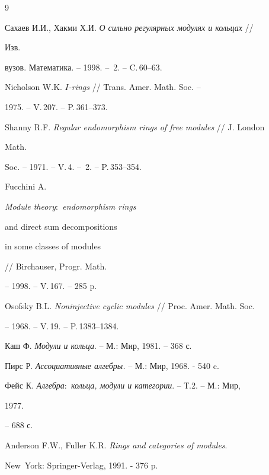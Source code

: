  


 


\begin{thebibliography}{9} 


 




Сахаев И.И., Хакми Х.И. {\em О сильно регулярных модулях и кольцах} // 


Изв. 


вузов. Математика. -- 1998. -- \No\,2. -- C.\,60--63. 




Nicholson W.K. {\em $I$-rings} // Trans. Amer. Math. Soc. -- 


1975. -- V.\,207. -- P.\,361--373. 




Shanny R.F. {\em Regular endomorphism rings of free modules} // J. London 


Math.  


Soc. -- 1971. -- V.\,4. -- \No\,2. -- P.\,353--354. 




Fucchini A. {\em Module theory${:}$ endomorphism rings  


and direct sum decompositions  


in some classes of modules} // Birchauser, Progr. Math. 


-- 1998. -- V.\,167. -- 285 p.




Osofsky B.L. {\em Noninjective cyclic modules} // Proc. Amer. Math. Soc. 


-- 1968. -- V.\,19. -- P.\,1383--1384. 




Каш Ф. {\em Модули и кольца}. -- М.: Мир, 1981. -- 368 с. 




Пирс Р. {\em Ассоциативные алгебры.} -- М.: Мир, 1968. - 540 c. 




Фейс К. {\em Алгебра${:}$ кольца, модули и категории}. -- Т.2. -- М.: Мир, 


1977.  


-- 688 с. 




Anderson F.W., Fuller K.R. {\em Rings and categories of modules}. 


New~York: Springer-Verlag, 1991. - 376 p. 


 


\end{thebibliography} 


 


\vskip 2cm 


 






 


\label{end} 


 





